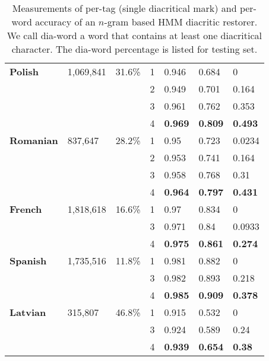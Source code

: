 \documentclass[12pt]{article}
\begin{document}
\begin{table}[measurements]
\begin{tabular}{|l|l|l||l|l|l|l|}
            \hline
            \textbf{Polish} & 1,069,841 & 31.6\% & 1 & 0.946 & 0.684 & 0\\ \cline{4-7}
            & & & 2 & 0.949 & 0.701 & 0.164\\ \cline{4-7}
            & & & 3 & 0.961 & 0.762 & 0.353\\ \cline{4-7}
            & & & 4 & \textbf{0.969} & \textbf{0.809} & \textbf{0.493}\\ \cline{4-7}
            \hline
            \textbf{Romanian} & 837,647 & 28.2\% & 1 & 0.95 & 0.723 & 0.0234\\ \cline{4-7}
            & & & 2 & 0.953 & 0.741 & 0.164\\ \cline{4-7}
            & & & 3 & 0.958 & 0.768 & 0.31\\ \cline{4-7}
            & & & 4 & \textbf{0.964} & \textbf{0.797} & \textbf{0.431}\\ \cline{4-7}
            \hline
            \textbf{French} & 1,818,618 & 16.6\% & 1 & 0.97 & 0.834 & 0\\ \cline{4-7}
            & & & 3 & 0.971 & 0.84 & 0.0933\\ \cline{4-7}
            & & & 4 & \textbf{0.975} & \textbf{0.861} & \textbf{0.274}\\ \cline{4-7}
            \hline
            \textbf{Spanish} & 1,735,516 & 11.8\% & 1 & 0.981 & 0.882 & 0\\ \cline{4-7}
            & & & 3 & 0.982 & 0.893 & 0.218\\ \cline{4-7}
            & & & 4 & \textbf{0.985} & \textbf{0.909} & \textbf{0.378}\\ \cline{4-7}
            \hline
            \textbf{Latvian} & 315,807 & 46.8\% & 1 & 0.915 & 0.532 & 0\\ \cline{4-7}
            & & & 3 & 0.924 & 0.589 & 0.24\\ \cline{4-7}
            & & & 4 & \textbf{0.939} & \textbf{0.654} & \textbf{0.38}\\ \cline{4-7}
            \hline
        \end{tabular}
        \caption{Measurements of per-tag (single diacritical mark) and per-word accuracy
        of an $n$-gram based HMM diacritic restorer.
        We call dia-word a word that contains at least one diacritical character.
        The dia-word percentage is listed for testing set.
        } \label{tab:baba}
    \end{table}


    
    
\end{document}
